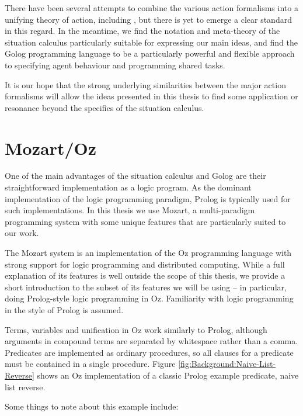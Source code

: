 There have been several attempts to combine the various action formalisms
into a unifying theory of action, including \citep{belleghem95combine_sitcalc_evtcalc,kowalski97reconcile_sitcalc_evtcalc,thielscher06reconcile_sc_fc,thielscher07unifying_action_calculus},
but there is yet to emerge a clear standard in this regard. In the
meantime, we find the notation and meta-theory of the situation calculus
particularly suitable for expressing our main ideas, and find the
Golog programming language to be a particularly powerful and flexible
approach to specifying agent behaviour and programming shared tasks.

It is our hope that the strong underlying similarities between the
major action formalisms will allow the ideas presented in this thesis
to find some application or resonance beyond the specifics of the
situation calculus.


\section{Mozart/Oz\label{sec:Background:Mozart/Oz}}

One of the main advantages of the situation calculus and Golog are
their straightforward implementation as a logic program. As the dominant
implementation of the logic programming paradigm, Prolog is typically
used for such implementations. In this thesis we use Mozart, a multi-paradigm
programming system with some unique features that are particularly
suited to our work.

The Mozart system \citep{vanroy99mozart} is an implementation of
the Oz programming language \citep{vanRoyHaridi04ctm} with strong
support for logic programming and distributed computing. While a full
explanation of its features is well outside the scope of this thesis,
we provide a short introduction to the subset of its features we will
be using -- in particular, doing Prolog-style logic programming in
Oz. Familiarity with logic programming in the style of Prolog is assumed.

Terms, variables and unification in Oz work similarly to Prolog, although
arguments in compound terms are separated by whitespace rather than
a comma. Predicates are implemented as ordinary procedures, so all
clauses for a predicate must be contained in a single procedure. Figure
\ref{fig:Background:Naive-List-Reverse} shows an Oz implementation
of a classic Prolog example predicate, naive list reverse.

\newpage{}Some things to note about this example include:

